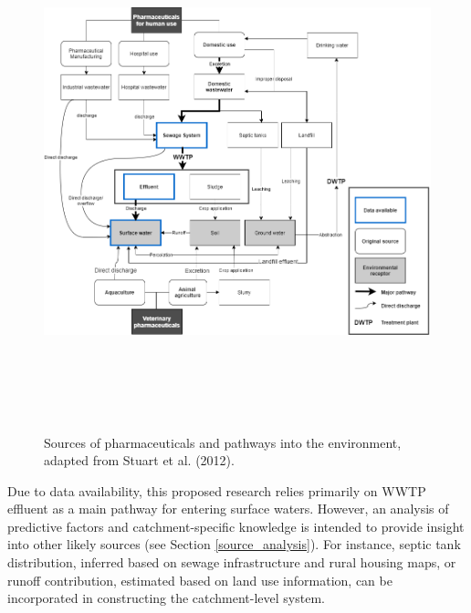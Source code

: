 \documentclass{article}
\begin{document}
\begin{figure}[!h]
    \centering
    \includegraphics[height=15cm]{fig_sources.png}
    \caption{Sources of pharmaceuticals and pathways into the environment, adapted from Stuart et al. (2012).}
    \label{fig_sources}
\end{figure}

Due to data availability, this proposed research relies primarily on WWTP effluent as a main pathway for entering surface waters. However, an analysis of predictive factors and catchment-specific knowledge is intended to provide insight into other likely sources (see Section \ref{source_analysis}). For instance, septic tank distribution, inferred based on sewage infrastructure and rural housing maps, or runoff contribution, estimated based on land use information, can be incorporated in constructing the catchment-level system.
\end{document}
